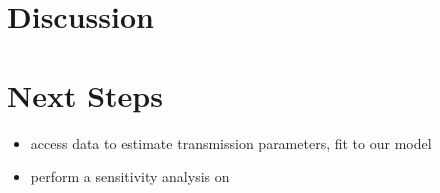\documentclass[12pt]{article}
\begin{document}
%
%
%
%
%
%



\section{Discussion}

\section{Next Steps}
\begin{itemize}
\item access data to estimate transmission parameters, fit to our model
\item perform a sensitivity analysis on  
\end{itemize}
\end{document}
